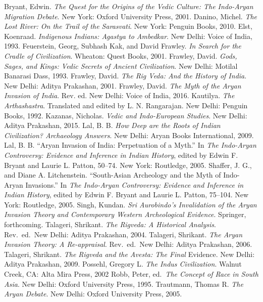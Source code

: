 \begin{thebibliography}{99}
 Bryant, Edwin. \textit{The Quest for the Origins of the Vedic Culture: The Indo-Aryan Migration Debate}. New York: Oxford University Press, 2001.
 Danino, Michel. \textit{The Lost River: On the Trail of the Sarasvati}. New York: Penguin Books, 2010.
 Elst, Koenraad. \textit{Indigenous Indians: Agastya to Ambedkar}. New Delhi: Voice of India, 1993.
 Feuerstein, Georg, Subhash Kak, and David Frawley. \textit{In Search for the Cradle of Civilization}. Wheaton: Quest Books, 2001.
 Frawley, David. \textit{Gods, Sages, and Kings: Vedic Secrets of Ancient Civilization}. New Delhi: Motilal Banarasi Dass, 1993.
 Frawley, David. \textit{The Rig Veda: And the History of India}. New Delhi: Aditya Prakashan, 2001. 
 Frawley, David. \textit{The Myth of the Aryan Invasion of India}. Rev. ed. New Delhi: Voice of India, 2016.
 Kautilya. \textit{The Arthashastra}. Translated and edited by L. N. Rangarajan. New Delhi: Penguin Books, 1992.
 Kazanas, Nicholas. \textit{Vedic and Indo-European Studies}. New Delhi: Aditya Prakashan, 2015.
 Lal, B. B. \textit{How Deep are the Roots of Indian Civilization? Archaeology Answers}. New Delhi: Aryan Books International, 2009.
 Lal, B. B. “Aryan Invasion of India: Perpetuation of a Myth.” In \textit{The Indo-Aryan Controversy: Evidence and Inference in Indian History}, edited by Edwin F. Bryant and Laurie L. Patton, 50--74. New York: Routledge, 2005.
 Shaffer, J. G., and Diane A. Litchenstein. “South-Asian Archeology and the Myth of Indo-Aryan Invasions.” In \textit{The Indo-Aryan Controversy: Evidence and Inference in Indian History}, edited by Edwin F. Bryant and Laurie L. Patton, 75--104. New York: Routledge, 2005.
 Singh, Kundan. \textit{Sri Aurobindo’s Invalidation of the Aryan Invasion Theory and Contemporary Western Archeological Evidence}. Springer, forthcoming. 
 Talageri, Shrikant. \textit{The Rigveda: A Historical Analysis}. Rev.\ ed.\ New Delhi: Aditya Prakashan, 2004. 
 Talageri, Shrikant. \textit{The Aryan Invasion Theory: A Re-appraisal}. Rev.\ ed.\ New Delhi: Aditya Prakashan, 2006.
 Talageri, Shrikant. \textit{The Rigveda and the Avesta: The Final} Evidence. New Delhi: Aditya Prakashan, 2009.
 Possehl, Gregory L. \textit{The Indus Civilization}. Walnut Creek, CA: Alta Mira Press, 2002
 Robb, Peter, ed.\ \textit{The Concept of Race in South Asia}. New Delhi: Oxford University Press, 1995. 
 Trautmann, Thomas R. \textit{The Aryan Debate}. New Delhi: Oxford University Press, 2005.
\end{thebibliography}
\newpage

